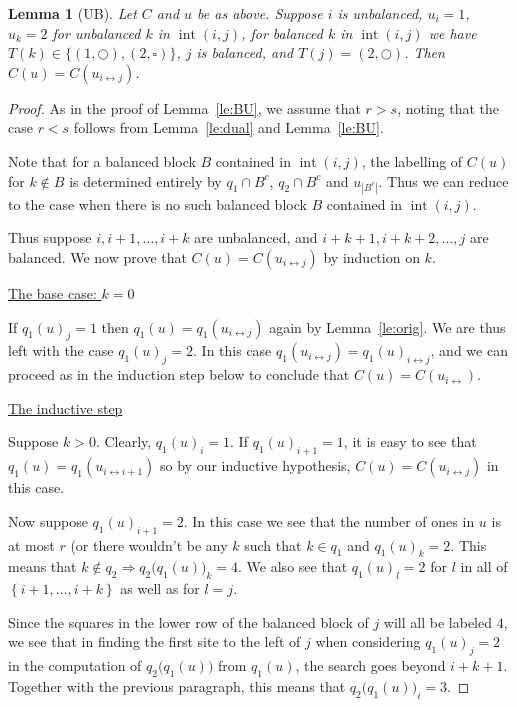 \documentclass[reqno]{amsart}
\newcommand{\0}{\phantom{c}}
\DeclareMathOperator{\inter}{int} %
\newcommand{\set}[1]{\left\{ #1 \right\}}
\theoremstyle{plain}
\newtheorem{lemma}[thm]{Lemma}
\theoremstyle{definition}
\numberwithin{equation}{section}
\begin{document}

\begin{lemma}[UB]
\label{le:UB}
  Let $C$ and $u$ be as above. Suppose $i$ is unbalanced, $u_i = 1$, $u_k = 2$ for unbalanced $k$ in $\inter(i,j)$, for balanced $k$ in $\inter(i,j)$ we have $T(k) \in \{(1,\bigcirc),(2,\square)\}$, $j$ is balanced, and $T(j) = (2,\bigcirc)$. Then $C(u) = C(u_{i \leftrightarrow j})$.
\end{lemma}

\begin{proof}
  As in the proof of Lemma~\ref{le:BU}, we assume that $r > s$, noting that the case $r < s$ follows from Lemma~\ref{le:dual} and Lemma~\ref{le:BU}.
  
  Note that for a balanced block $B$ contained in $\inter(i,j)$, the labelling of $C(u)$ for $k \notin B$ is determined entirely by $q_1\cap B^c$, $q_2\cap B^c$ and $u_{|B^c|}$. Thus we can reduce to the case when there is no such balanced block $B$ contained in $\inter(i,j)$.  

  Thus suppose $i, i+1, \dotsc, i+k$ are unbalanced, and $i+k+1, i+k+2, \dotsc, j$ are balanced. We now prove that $C(u) = C(u_{i\leftrightarrow j})$ by induction on $k$. 
  
  \vspace{10pt}
  \noindent \underline{The base case: $k = 0$}

  If $q_1(u)_j = 1$ then $q_1(u) = q_1(u_{i\leftrightarrow j})$ again by Lemma~\ref{le:orig}. We are thus left with the case $q_1(u)_j = 2$. In this case $q_1(u_{i\leftrightarrow j}) = q_1(u)_{i\leftrightarrow j}$, and we can proceed as in the induction step below to conclude that $C(u) = C(u_{i\leftrightarrow})$.

  \vspace{10pt}
  \noindent \underline{The inductive step}

  Suppose $k > 0$. Clearly, $q_1(u)_i = 1$. If $q_1(u)_{i+1} = 1$, it is easy to see that $q_1(u) = q_1(u_{i\leftrightarrow i+1})$ so by our inductive hypothesis, $C(u) = C(u_{i\leftrightarrow j})$ in this case. 

  Now suppose $q_1(u)_{i+1} = 2$. In this case we see that the number of ones in $u$ is at most $r$ (or there wouldn't be any $k$ such that $k \in q_1$ and $q_1(u)_k=2$. This means that $k \notin q_2 \Rightarrow q_2\bigl( q_1(u) \bigr)_k = 4$. We also see that $q_1(u)_l = 2$ for $l$ in all of $\set{i+1, \dotsc, i+k}$ as well as for $l= j$.

  Since the squares in the lower row of the balanced block of $j$ will all be labeled $4$, we see that in finding the first site to the left of $j$ when considering $q_1(u)_j = 2$ in the computation of $q_2\bigl( q_1(u) \bigr)$ from $q_1(u)$, the search goes beyond $i+k+1$. Together with the previous paragraph, this means that $q_2\bigl( q_1(u) \bigr)_i = 3$.


\end{proof}
\end{document}

